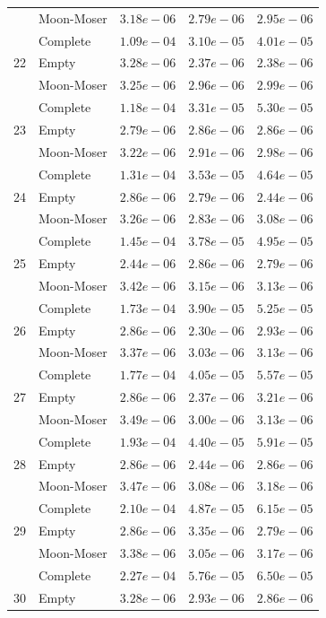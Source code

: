 \documentclass[12pt,a4paper]{article}
\begin{document}
\begin{longtable}{|l||l|l|l|l|}
  & Moon-Moser & $3.18e-06$ & $2.79e-06$ & $2.95e-06$ \\
  & Complete & $1.09e-04$ & $3.10e-05$ & $4.01e-05$ \\
  \hline
  22 & Empty & $3.28e-06$ & $2.37e-06$ & $2.38e-06$ \\
  & Moon-Moser & $3.25e-06$ & $2.96e-06$ & $2.99e-06$ \\
  & Complete & $1.18e-04$ & $3.31e-05$ & $5.30e-05$ \\
  \hline
  23 & Empty & $2.79e-06$ & $2.86e-06$ & $2.86e-06$ \\
  & Moon-Moser & $3.22e-06$ & $2.91e-06$ & $2.98e-06$ \\
  & Complete & $1.31e-04$ & $3.53e-05$ & $4.64e-05$ \\
  \hline
  24 & Empty & $2.86e-06$ & $2.79e-06$ & $2.44e-06$ \\
  & Moon-Moser & $3.26e-06$ & $2.83e-06$ & $3.08e-06$ \\
  & Complete & $1.45e-04$ & $3.78e-05$ & $4.95e-05$ \\
  \hline
  25 & Empty & $2.44e-06$ & $2.86e-06$ & $2.79e-06$ \\
  & Moon-Moser & $3.42e-06$ & $3.15e-06$ & $3.13e-06$ \\
  & Complete & $1.73e-04$ & $3.90e-05$ & $5.25e-05$ \\
  \hline
  26 & Empty & $2.86e-06$ & $2.30e-06$ & $2.93e-06$ \\
  & Moon-Moser & $3.37e-06$ & $3.03e-06$ & $3.13e-06$ \\
  & Complete & $1.77e-04$ & $4.05e-05$ & $5.57e-05$ \\
  \hline
  27 & Empty & $2.86e-06$ & $2.37e-06$ & $3.21e-06$ \\
  & Moon-Moser & $3.49e-06$ & $3.00e-06$ & $3.13e-06$ \\
  & Complete & $1.93e-04$ & $4.40e-05$ & $5.91e-05$ \\
  \hline
  28 & Empty & $2.86e-06$ & $2.44e-06$ & $2.86e-06$ \\
  & Moon-Moser & $3.47e-06$ & $3.08e-06$ & $3.18e-06$ \\
  & Complete & $2.10e-04$ & $4.87e-05$ & $6.15e-05$ \\
  \hline
  29 & Empty & $2.86e-06$ & $3.35e-06$ & $2.79e-06$ \\
  & Moon-Moser & $3.38e-06$ & $3.05e-06$ & $3.17e-06$ \\
  & Complete & $2.27e-04$ & $5.76e-05$ & $6.50e-05$ \\
  \hline
  30 & Empty & $3.28e-06$ & $2.93e-06$ & $2.86e-06$ \\

\end{longtable}
\end{document}
